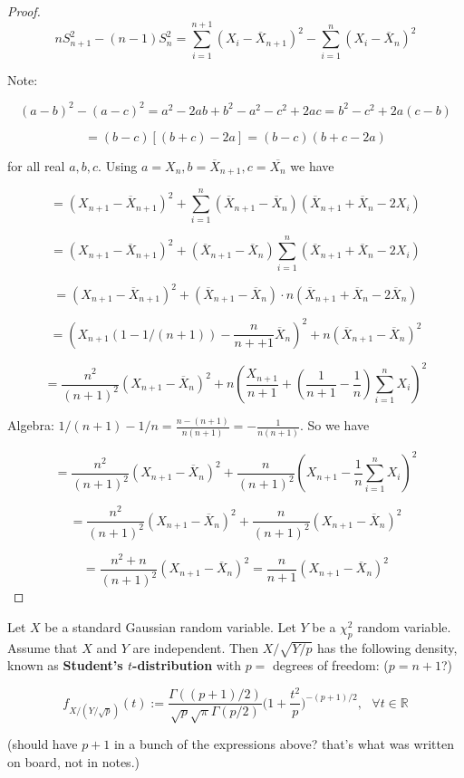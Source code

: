 \begin{proof}

\[
n S_{n+1}^2  - (n-1)S_n^2 = \sum_{i=1}^{n+1} (X_i - \overline{X}_{n+1})^2 - \sum_{i=1}^n (X_i - \overline{X}_n)^2 
\]

Note:

\[
(a-b)^2 - (a-c)^2 = a^2 - 2ab + b^2 - a^2 - c^2 + 2ac = b^2 - c^2 + 2a(c-b) 
\]

\[
= (b-c)[(b+c)  - 2a]= (b-c)(b+c-2a)
\]

for all real \(a, b,c\). Using \(a=X_n, b= \overline{X}_{n+1}, c= \overline{X_n}\) we have

\[
= (X_{n+1} - \overline{X}_{n+1})^2 + \sum_{i=1}^n(\overline{X}_{n+1}- \overline{X}_n)(\overline{X}_{n+1} + \overline{X}_n - 2 X_i) 
\]

\[
= (X_{n+1} - \overline{X}_{n+1})^2 + (\overline{X}_{n+1} - \overline{X}_n) \sum_{i=1}^n (\overline{X}_{n+1} + \overline{X}_n - 2 X_i)
\]

\[
= (X_{n+1} - \overline{X}_{n+1})^2 + (\overline{X}_{n+1} - \overline{X}_n) \cdot n (\overline{X}_{n+1} + \overline{X}_n - 2 \overline{X}_n)
\]

\[
=(X_{n+1}(1 - 1/(n+1)) - \frac{n}{n++1} \overline{X}_n)^2 + n(\overline{X}_{n+1} - \overline{X}_n)^2
\]

\[
= \frac{n^2}{(n+1)^2} (X_{n+1} - \overline{X}_n)^2 + n ( \frac{X_{n+1}}{n+1} + ( \frac{1}{n+1} - \frac{1}{n} ) \sum_{i=1}^n X_i )^2
\]

Algebra: \(1/(n+1) - 1/n = \frac{n - (n+1)}{n(n+1)} = - \frac{1}{n(n+1)}\). So we have

\[
= \frac{n^2}{(n+1)^2}(X_{n+1}-\overline{X}_n)^2  + \frac{n}{(n+1)^2} (X_{n+1} - \frac{1}{n} \sum_{i=1}^n X_i )^2
\]

\[
= \frac{n^2}{(n+1)^2} (X_{n+1}-\overline{X}_n)^2 + \frac{n}{(n+1)^2} (X_{n+1} - \overline{X}_n)^2
\]

\[
=\frac{n^2+n}{(n+1)^2} (X_{n+1} - \overline{X}_n)^2 = \frac{n}{n+1}(X_{n+1} - \overline{X}_n)^2
\]


\end{proof}

\begin{proposition} Let \(X\) be a standard Gaussian random variable. Let \(Y\) be a \(\chi_p^2\) random variable. Assume that \(X\) and \(Y\) are independent. Then \(X/\sqrt{Y/p}\) has the following density, known as \textbf{Student's \(t\)-distribution} with \(p=\) degrees of freedom: (\(p=n+1\)?)

\[
f_{X/(Y/\sqrt{p})}(t):= \frac{ \Gamma((p+1)/2)}{\sqrt{p} \sqrt{\pi} \Gamma(p/2) } \bigg( 1 + \frac{t^2}{p} \bigg)^{-(p+1)/2}, \ \ \ \forall t \in \mathbb{R}
\]

(should have \(p+1\) in a bunch of the expressions above? that's what was written on board, not in notes.)

\end{proposition}

